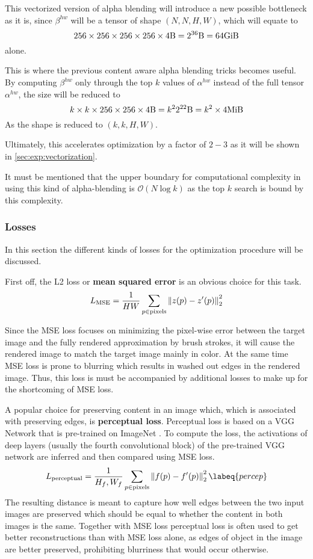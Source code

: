 This vectorized version of alpha blending will introduce a new possible bottleneck
as it is, since $\beta^{hw}$ will be a tensor of shape $(N, N, H, W)$, which will
equate to
$$
256 \times 256 \times 256 \times 256 \times 4 \si{\byte} = 2^{36}\si{\byte} = 64\si{\gibi\byte}
$$
alone.

This is where the previous content aware alpha blending tricks becomes useful.
By computing $\beta^{hw}$ only through the top $k$ values of $\alpha^{hw}$ instead
of the full tensor $\alpha^{hw}$, the size will be reduced to
$$
k \times k \times 256 \times 256 \times 4 \si{\byte} = k^2 2^{22}\si{\byte} = k^2 \times 4\si{\mebi\byte}
$$
As the shape is reduced to $(k, k, H, W)$.

Ultimately, this accelerates optimization by a factor of $2-3$ as it will be shown
in \ref{sec:exp:vectorization}.

It must be mentioned that the upper boundary for computational complexity in using
this kind of alpha-blending is $\mathcal{O}(N \log k)$ as the top $k$ search is
bound by this complexity.

\subsubsection{Losses}

In this section the different kinds of losses for the optimization procedure will
be discussed.

First off, the L2 loss or \textbf{mean squared error} is an obvious choice for this task.
\begin{align}
    L_{\text{MSE}} = \frac{1}{HW} \sum_{p \in \text{pixels}} \left\lVert z(p) - z'(p)\right\rVert_2^2
\end{align}

Since the MSE loss focuses on minimizing the pixel-wise error between the
target image and the fully rendered approximation by brush strokes, it will cause the
rendered image to match the target image mainly in color.
At the same time MSE loss is prone to blurring which results in washed out edges
in the rendered image.
Thus, this loss is must be accompanied by additional losses to make up for the shortcoming
of MSE loss.

A popular choice for preserving content in an image which, which is associated with
preserving edges, is \textbf{perceptual loss}.
Perceptual loss is based on a VGG Network \cite{VGG} that is pre-trained on ImageNet \cite{ImageNet}.
To compute the loss, the activations of deep layers (usually the fourth convolutional
block) of the pre-trained VGG network are inferred and then compared using MSE loss.
\begin{align}
    L_{\text{perceptual}} = \frac{1}{H_f, W_f} \sum_{p \in \text{pixels}} \norm{f(p) - f'(p)}_2^2
    \labeq{percep}
\end{align}
The resulting distance is meant to capture how well edges between the two input images
are preserved which should be equal to whether the content in both images is the same.
Together with MSE loss perceptual loss is often used to get better reconstructions
than with MSE loss alone, as edges of object in the image are better preserved, prohibiting
blurriness that would occur otherwise.

